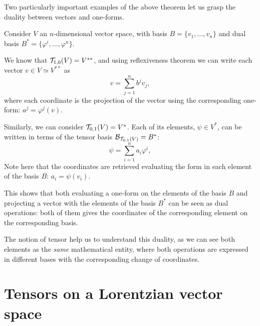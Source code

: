 Two particularly important examples of the above theorem let us grasp the duality between vectors and one-forms.

Consider $V$ an $n$-dimensional vector space, with basis $B = \{v_1, \dots, v_n\}$ and dual basis $B^* = \{\varphi^i, \dots, \varphi^n\}$.

We know that ${\mathcal T}_{1,0}(V) = V^{**}$, and using reflexiveness theorem we can write each vector $v \in V \simeq V^{**}$ as
\[
v = \sum_{j=1}^n b^j v_j,
\]
where each coordinate is the projection of the vector using the corresponding one-form: $a^j = \varphi^j(v)$.

Similarly, we can consider ${\mathcal T}_{0,1}(V) = V^*$. Each of its elements, $\psi \in V^*$, can be written in terms of the tensor basis $\mathcal{B}_{{\mathcal T}_{0,1}(V)} = B^*$:
\[
	\psi = \sum_{i=1}^n a_i \varphi^i,
\]
Note here that the coordinates are retrieved evaluating the form in each element of the basis $B$: $a_i = \psi(v_i)$.

This shows that both evaluating a one-form on the elements of the basis $B$ and projecting a vector with the elements of the basis $B^*$ can be seen as dual operations: both of them gives the coordinates of the corresponding element on the corresponding basis.

The notion of tensor help us to understand this duality, as we can see both elements as the \emph{same} mathematical entity, where both operations are expressed in different bases with the corresponding change of coordinates.

\section{Tensors on a Lorentzian vector space}


















